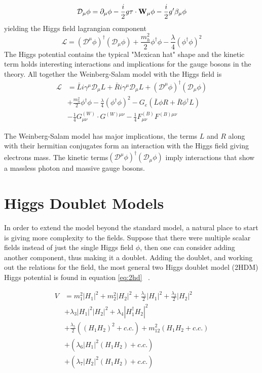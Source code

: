 \[\mathcal{D}_\mu \phi = \partial_\mu \phi - \frac{i}{2}g\bold{\tau}\cdot\bold{W}_\mu \phi - \frac{i}{2}g'\beta_\mu\phi \]
yielding the Higgs field lagrangian component 
\[\mathcal{L} = (\mathcal{D}^\mu \phi)^\dag (\mathcal{D}_\mu \phi) + \frac{m^2_h}{2}\phi^\dag \phi - \frac{\lambda}{4}(\phi^\dag\phi)^2 \] 
The Higgs potential contains the typical "Mexican hat" shape and the kinetic term holds interesting interactions and implications for the gauge bosons in the theory. 
All together the Weinberg-Salam model with the Higgs field is ~\cite{Lancaster:1629337}
\begin{align}
\label{eq:ws}
\mathcal{L} &= \bar{L}i \gamma^\mu \mathcal{D}_\mu L +\bar{R}i \gamma^\mu \mathcal{D}_\mu L + (\mathcal{D}^\mu \phi)^\dag(\mathcal{D}_\mu\phi)  \\
            &+\frac{m^2_h}{2}\phi^\dag \phi - \frac{\lambda}{4}(\phi^\dag\phi)^2 - G_e(\bar{L}\phi R +\bar{R}\phi^\dag L)\nonumber \\
            &-\frac{1}{4}G^{(W)}_{\mu\nu}\cdot G^{(W)\mu\nu} - \frac{1}{4}F^{(B)}_{\mu\nu} F^{(B)\mu\nu} 
\end{align}

The Weinberg-Salam model has major implications, the terms $L$ and $R$ along with their hermitian conjugates form an interaction with the Higgs field giving electrons mass. The kinetic terms$(\mathcal{D}^\mu \phi)^\dag(\mathcal{D}_\mu\phi)$ imply interactions that show a massless photon and massive gauge bosons.  

\section{Higgs Doublet Models}
In order to extend the model beyond the standard model, a natural place to start is giving more complexity to the fields. Suppose that there were multiple scalar fields instead of just the single Higgs field $\phi$, then one can consider adding another component, thus making it a doublet. Adding the doublet, and working out the relations for the field, the most general two Higgs doublet model (2HDM) Higgs potential is found in equation \ref{eq:2hd} ~\cite{Branco_2012}.

\begin{align} 
\label{eq:2hd}
V &= m^2_1|H_1|^2 + m^2_2|H_2|^2 + \frac{\lambda_1}{2}|H_1|^2 + \frac{\lambda_2}{2}|H_2|^2  \\
    &+\lambda_3|H_1|^2|H_2|^2 + \lambda_4|H^\dag_1 H_2|^2 \nonumber \\
    &+\frac{\lambda_5}{2}\left((H_1H_2)^2 + c.c.\right) +m^2_{12}\left(H_1 H_2 + c.c.\right) \nonumber \\
    &+\left(\lambda_6|H_1|^2(H_1 H_2) + c.c.\right) \nonumber \\
    &+\left(\lambda_7|H_2|^2(H_1 H_2) + c.c.\right) \nonumber 
\end{align}

